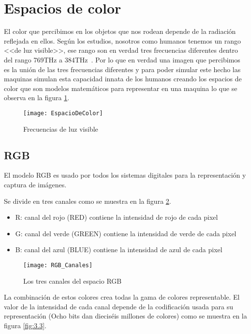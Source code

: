 \section{Espacios de color }
El color que percibimos en los objetos que nos rodean depende de la radiación reflejada en ellos. Según los estudios, nosotros como humanos tenemos un rango <<de luz visible>>, ese rango son en verdad tres frecuencias diferentes dentro del rango 769THz a 384THz~\cite{Manual:HAE}.
Por lo que en verdad una imagen que percibimos es la unión de las tres frecuencias diferentes y para poder simular este hecho las maquinas simulan esta capacidad innata de los humanos creando los espacios de color que son modelos matemáticos para representar en una maquina lo que se observa en la figura \ref{fig:3.1}.

\begin{figure}[h]
\centering
\texttt{[image: EspacioDeColor]}
\caption{Frecuencias de luz visible \cite{Manual:HAE}}
\label{fig:3.1}
\end{figure}

\subsection{RGB}
El modelo RGB es usado por todos los sistemas digitales para la representación y captura de imágenes.

Se divide en tres canales como se muestra en la figura \ref{fig:3.2}.

\begin{itemize}
	\item R: canal del rojo (RED) contiene la intensidad de rojo de cada pixel
	\item G: canal del verde (GREEN) contiene la intensidad de verde de cada pixel
	\item B: canal del azul (BLUE) contiene la intensidad de azul de cada pixel
\end{itemize}

\begin{figure}[h]
\centering
\texttt{[image: RGB\_Canales]}
\caption{Los tres canales del espacio RGB~\cite{Manual:HAE}}
\label{fig:3.2}
\end{figure}
La combinación de estos colores crea todas la gama de colores representable.
El valor de la intensidad de cada canal depende de la codificación usada para su representación (Ocho bits dan dieciséis millones de colores) como se muestra en la figura  \ref{fig:3.3}.

